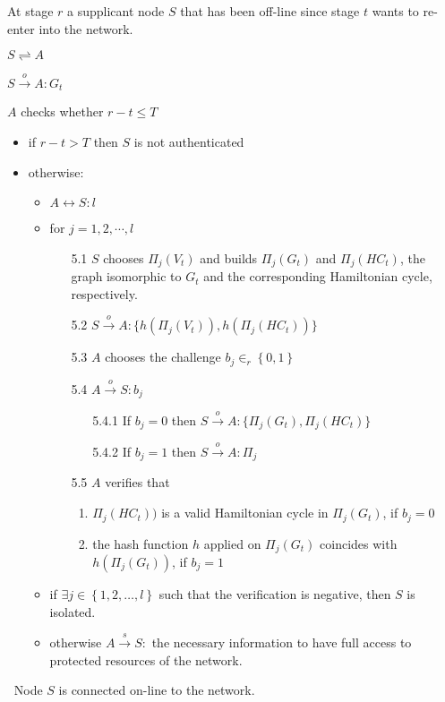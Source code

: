 \documentclass[conference]{IEEEtran}
\begin{document}
\begin{description} 


\item  [Input:] At stage $r$ a supplicant node $S$ that has been off-line
since stage $t$ wants to re-enter into the network.
\item [1.] $S\rightleftharpoons A$
    \item [2.] $S \stackrel{o}{\rightarrow} A: G_t$
    \item [3.] $A$ checks whether $r - t \leq T$
      \begin {itemize}
      \item [4.] if $r - t > T$ then $S$ is not authenticated
      \item [5.] otherwise:
      \begin{itemize}
        \item $A \leftrightarrow S: l $
        \item for $ j = 1,2,\cdots,l$
        \begin{enumerate}
             \item [5.1] $S$  chooses ${\Pi}_j(V_t)$ and builds  ${\Pi}_j(G_t)$ and ${\Pi}_j(HC_t)$, the graph
             isomorphic to $G_t$ and the corresponding Hamiltonian cycle, respectively.
             \item [5.2] $S \stackrel{o}{\rightarrow} A: \{ h({\Pi}_j(V_t)), h({\Pi}_j(HC_t)) \}$
             \item [5.3] $A$ chooses  the challenge $b_j \in_r \left\{0,1\right \} $
             \item [5.4] $A \stackrel{o}{\rightarrow} S: b_j$
             \begin{enumerate}
                    \item [5.4.1] If $b_j=0$ then $S \stackrel{o}{\rightarrow} A: \{ {\Pi}_j(G_t), {\Pi}_j(HC_t) \} $
                    \item [5.4.2] If $b_j=1$ then $S \stackrel{o}{\rightarrow} A: {\Pi}_j$
             \end{enumerate}
             \item [5.5] $A$ verifies that
             \begin{enumerate}
                \item ${\Pi}_j(HC_t))$ is a valid Hamiltonian cycle in ${\Pi}_j(G_t)$, if $b_j=0$
                \item the hash function $h$ applied on ${\Pi}_j(G_t)$ coincides with $h({\Pi}_j(G_t))$, if $b_j=1$
             \end{enumerate}
        \end{enumerate}
        \item if $\exists  j \in \left\{1,2,\ldots,l\right\}$ such that the verification is negative, then $S$ is isolated.
        \item otherwise $A \stackrel{s}{\rightarrow} S:$ the necessary information to have full access
            to protected resources of the network.
    \end{itemize}
    \end{itemize}
\item [Output:] $\ $ Node $S$ is connected on-line to the network.
\end{description}
\end{document}
